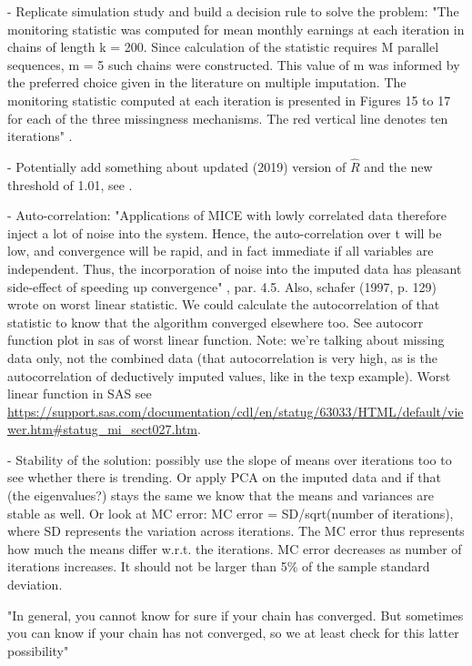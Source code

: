 \documentclass[article]{jss}
\begin{document}
- Replicate simulation study and build a decision rule to solve the problem: "The monitoring statistic was computed for mean monthly earnings at each iteration in chains of length k = 200. Since calculation of the statistic requires M parallel sequences, m = 5 such chains were constructed. This value of m was informed by the preferred choice given in the literature on multiple imputation. The monitoring statistic computed at each iteration is presented in Figures 15 to 17 for each of the three missingness mechanisms. The red vertical line denotes ten iterations" \cite[p.~49]{lace07}.

- Potentially add something about updated (2019) version of $\widehat{R}$ and the new threshold of 1.01, see \citep{veht19}.

- Auto-correlation: "Applications of MICE with lowly correlated data therefore inject a lot of noise into the system. Hence, the auto-correlation over t will be low, and convergence will be rapid, and in fact immediate if all variables are independent. Thus, the incorporation of noise into the imputed data has pleasant side-effect of speeding up convergence" \citep{buur18}, par. 4.5. Also, schafer (1997, p. 129) wrote on worst linear statistic. We could calculate the autocorrelation of that statistic to know that the algorithm converged elsewhere too. See autocorr function plot in sas of worst linear function. Note: we're talking about missing data only, not the combined data (that autocorrelation is very high, as is the autocorrelation of deductively imputed values, like in the texp example). Worst linear function in SAS see \url{https://support.sas.com/documentation/cdl/en/statug/63033/HTML/default/viewer.htm#statug_mi_sect027.htm}.

- Stability of the solution: possibly use the slope of means over iterations too to see whether there is trending. Or apply PCA on the imputed data and if that (the eigenvalues?) stays the same we know that the means and variances are stable as well. Or look at MC error: MC error = SD/sqrt(number of iterations), where SD represents the variation across iterations. The MC error thus represents how much the means differ w.r.t. the iterations. MC error decreases as number of iterations increases. It should not be larger than 5\% of the sample standard deviation.

"In general, you cannot know for sure if your chain has converged. But sometimes you can know if your chain has not converged, so we at least check for this latter possibility" \cite[p.~101]{hoff09}
\end{document}
